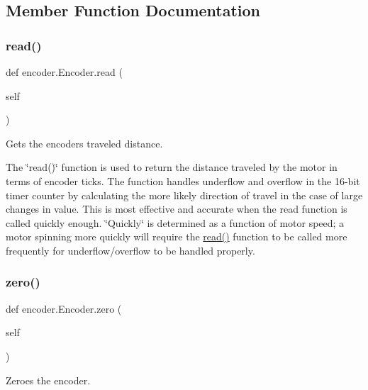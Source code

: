\subsection{Member Function Documentation}
\mbox{\label{classencoder_1_1_encoder_aa1c1535160682500f5214f45d8197027}} 
\subsubsection{\texorpdfstring{read()}{read()}}
{\footnotesize\ttfamily def encoder.\+Encoder.\+read (\begin{DoxyParamCaption}\item[{}]{self }\end{DoxyParamCaption})}



Gets the encoder\textquotesingle{}s traveled distance. 

The \char`\"{}read()\char`\"{} function is used to return the distance traveled by the motor in terms of encoder ticks. The function handles underflow and overflow in the 16-\/bit timer counter by calculating the more likely direction of travel in the case of large changes in value. This is most effective and accurate when the read function is called quickly enough. \char`\"{}\+Quickly\char`\"{} is determined as a function of motor speed; a motor spinning more quickly will require the \mbox{\hyperlink{classencoder_1_1_encoder_aa1c1535160682500f5214f45d8197027}{read()}} function to be called more frequently for underflow/overflow to be handled properly. \mbox{\label{classencoder_1_1_encoder_ae238ecdbcbce8a193c2e0ffbb4d1dd29}} 
\subsubsection{\texorpdfstring{zero()}{zero()}}
{\footnotesize\ttfamily def encoder.\+Encoder.\+zero (\begin{DoxyParamCaption}\item[{}]{self }\end{DoxyParamCaption})}



Zeroes the encoder. 

